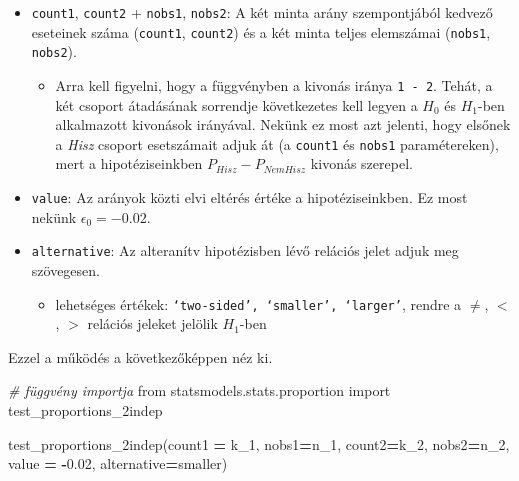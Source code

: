 \documentclass[
]{book}
\newenvironment{Shaded}{\begin{snugshade}}{\end{snugshade}}
\newcommand{\CommentTok}[1]{\textcolor[rgb]{0.56,0.35,0.01}{\textit{#1}}}
\newcommand{\FloatTok}[1]{\textcolor[rgb]{0.00,0.00,0.81}{#1}}
\newcommand{\ImportTok}[1]{#1}
\newcommand{\NormalTok}[1]{#1}
\newcommand{\OperatorTok}[1]{\textcolor[rgb]{0.81,0.36,0.00}{\textbf{#1}}}
\newcommand{\StringTok}[1]{\textcolor[rgb]{0.31,0.60,0.02}{#1}}
\providecommand{\tightlist}{%
  \setlength{\itemsep}{0pt}\setlength{\parskip}{0pt}}
\begin{document}
\begin{itemize}
\tightlist
\item
  \texttt{count1}, \texttt{count2} + \texttt{nobs1}, \texttt{nobs2}: A két minta arány szempontjából kedvező eseteinek száma (\texttt{count1}, \texttt{count2}) és a két minta teljes elemszámai (\texttt{nobs1}, \texttt{nobs2}).

  \begin{itemize}
  \tightlist
  \item
    Arra kell figyelni, hogy a függvényben a kivonás iránya \texttt{1\ -\ 2}. Tehát, a két csoport átadásának sorrendje következetes kell legyen a \(H_0\) és \(H_1\)-ben alkalmazott kivonások irányával. Nekünk ez most azt jelenti, hogy elsőnek a \emph{Hisz} csoport esetszámait adjuk át (a \texttt{count1} és \texttt{nobs1} paramétereken), mert a hipotéziseinkben \(P_{Hisz} - P_{NemHisz}\) kivonás szerepel.
  \end{itemize}
\item
  \texttt{value}: Az arányok közti elvi eltérés értéke a hipotéziseinkben. Ez most nekünk \(\epsilon_0=-0.02\).
\item
  \texttt{alternative}: Az alteranítv hipotézisben lévő relációs jelet adjuk meg szövegesen.

  \begin{itemize}
  \tightlist
  \item
    lehetséges értékek: \texttt{‘two-sided’,\ ‘smaller’,\ ‘larger’}, rendre a \(\neq\), \(<\), \(>\) relációs jeleket jelölik \(H_1\)-ben
  \end{itemize}
\end{itemize}

Ezzel a működés a következőképpen néz ki.

\begin{Shaded}
\begin{Highlighting}[]
\CommentTok{\# függvény importja}
\ImportTok{from}\NormalTok{ statsmodels.stats.proportion }\ImportTok{import}\NormalTok{ test\_proportions\_2indep}

\NormalTok{test\_proportions\_2indep(count1 }\OperatorTok{=}\NormalTok{ k\_1, nobs1}\OperatorTok{=}\NormalTok{n\_1,}
\NormalTok{                        count2}\OperatorTok{=}\NormalTok{k\_2, nobs2}\OperatorTok{=}\NormalTok{n\_2,}
\NormalTok{                        value }\OperatorTok{=} \OperatorTok{{-}}\FloatTok{0.02}\NormalTok{, alternative}\OperatorTok{=}\StringTok{\textquotesingle{}smaller\textquotesingle{}}\NormalTok{)}
\end{Highlighting}
\end{Shaded}
\end{document}
